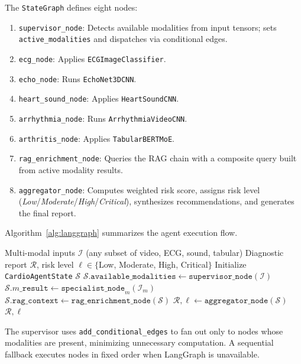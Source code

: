 \documentclass[journal,10pt,twoside]{IEEEtran}
\begin{document}
The \texttt{StateGraph} defines eight nodes:
\begin{enumerate}
  \item \texttt{supervisor\_node}: Detects available modalities from input tensors;
        sets \texttt{active\_modalities} and dispatches via conditional edges.
  \item \texttt{ecg\_node}: Applies \texttt{ECGImageClassifier}.
  \item \texttt{echo\_node}: Runs \texttt{EchoNet3DCNN}.
  \item \texttt{heart\_sound\_node}: Applies \texttt{HeartSoundCNN}.
  \item \texttt{arrhythmia\_node}: Runs \texttt{ArrhythmiaVideoCNN}.
  \item \texttt{arthritis\_node}: Applies \texttt{TabularBERTMoE}.
  \item \texttt{rag\_enrichment\_node}: Queries the RAG chain with a composite query
        built from active modality results.
  \item \texttt{aggregator\_node}: Computes weighted risk score, assigns risk level
        (\textit{Low}/\textit{Moderate}/\textit{High}/\textit{Critical}), synthesizes
        recommendations, and generates the final report.
\end{enumerate}

Algorithm~\ref{alg:langgraph} summarizes the agent execution flow.

\begin{algorithm}[!t]
\caption{LangGraph Diagnostic Agent Execution}
\label{alg:langgraph}
\begin{algorithmic}[1]
  \Require Multi-modal inputs $\mathcal{I}$ (any subset of video, ECG, sound, tabular)
  \Ensure Diagnostic report $\mathcal{R}$, risk level $\ell \in \{$Low, Moderate, High, Critical$\}$
  \State Initialize \texttt{CardioAgentState} $\mathcal{S}$
  \State $\mathcal{S}.\texttt{available\_modalities} \leftarrow \texttt{supervisor\_node}(\mathcal{I})$
    \State $\mathcal{S}.m\_\texttt{result} \leftarrow \texttt{specialist\_node}_m(\mathcal{I}_m)$
  \EndFor
  \State $\mathcal{S}.\texttt{rag\_context} \leftarrow \texttt{rag\_enrichment\_node}(\mathcal{S})$
  \State $\mathcal{R}, \ell \leftarrow \texttt{aggregator\_node}(\mathcal{S})$
  \State \Return $\mathcal{R}, \ell$
\end{algorithmic}
\end{algorithm}

The supervisor uses \texttt{add\_conditional\_edges} to fan out only to nodes whose
modalities are present, minimizing unnecessary computation.
A sequential fallback executes nodes in fixed order when LangGraph is unavailable.
\end{document}
